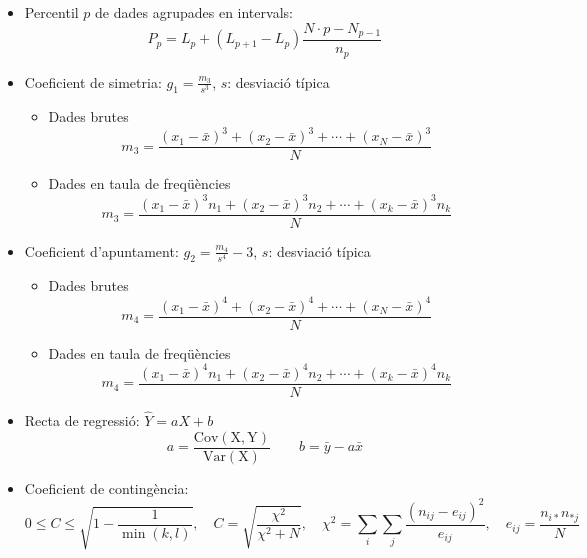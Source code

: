 \documentclass[a4paper,10pt]{article}
\begin{document}
\begin{itemize}
\item Percentil $p$ de dades agrupades en intervals:
\[
P_p=L_p + (L_{p+1}-L_p) \frac{N \cdot p - N_{p-1}}{n_p}
\]

\item Coeficient de simetria: $g_1=\frac{m_3}{s^3}$, $s$: desviació típica
\begin{itemize}
\item Dades brutes
\[
m_3=\frac{(x_1-\bar{x})^3+(x_2-\bar{x})^3+\cdots+(x_N-\bar{x})^3}{N}
\]
\item Dades en taula de freqüències
\[
m_3=\frac{(x_1-\bar{x})^3 n_1+(x_2-\bar{x})^3 n_2+\cdots+(x_k-\bar{x})^3 n_k}{N}
\]
\end{itemize}

\item Coeficient d'apuntament: $g_2=\frac{m_4}{s^4} - 3$, $s$: desviació típica
\begin{itemize}
\item Dades brutes
\[
m_4=\frac{(x_1-\bar{x})^4+(x_2-\bar{x})^4+\cdots+(x_N-\bar{x})^4}{N}
\]
\item Dades en taula de freqüències
\[
m_4=\frac{(x_1-\bar{x})^4 n_1+(x_2-\bar{x})^4 n_2+\cdots+(x_k-\bar{x})^4 n_k}{N}
\]
\end{itemize}

\item Recta de regressió: $\hat{Y}=aX+b$
\[
a=\frac{\mathrm{Cov(X, Y)}}{\mathrm{Var(X)}} \qquad b=\bar{y}-a \bar{x}
\]

\item Coeficient de conting\`encia:
\[
0\leq C \leq \sqrt{1-\dfrac{1}{\min(k,l)}},\quad C=\sqrt{\dfrac {\chi^2}{\chi^2+N}},\quad \chi^2=\sum_i \sum_j \dfrac {(n_{ij}-e_{ij})^2}{e_{ij}},\quad e_{ij}=\dfrac {n_{i*}n_{*j}}{N}
\]

\end{itemize}
\end{document}
